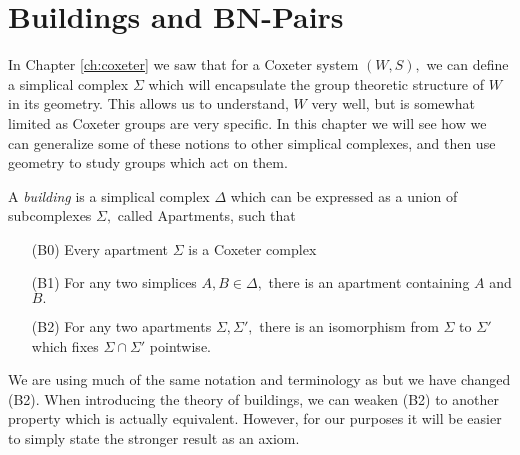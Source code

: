 \documentclass[class=book, crop=false,12 pt]{standalone}
\begin{document}
\chapter{Buildings and BN-Pairs}
\label{ch:building}
In Chapter \ref{ch:coxeter} we saw that for a Coxeter system $(W,S),$ we can define a simplical complex $\Sigma$ which will encapsulate the group theoretic structure of $W$ in its geometry. This allows us to understand, $W$ very well, but is somewhat limited as Coxeter groups are very specific. In this chapter we will see how we can generalize some of these notions to other simplical complexes, and then use geometry to study groups which act on them.

\begin{defn}
	\label{defn:building}
	A \emph{building} is a simplical complex $\Delta$ which can be expressed as a union of subcomplexes $\Sigma,$ called Apartments, such that
	\begin{itemize}
		\item[(B0)] Every apartment $\Sigma$ is a Coxeter complex
		\item[(B1)] For any two simplices $A,B\in \Delta,$ there is an apartment containing $A$ and $B.$
		\item[(B2)] For any two apartments $\Sigma,\Sigma',$ there is an isomorphism from $\Sigma$ to $\Sigma'$ which fixes $\Sigma\cap \Sigma'$ pointwise.
	\end{itemize}
\end{defn}

We are using much of the same notation and terminology as \cite{buildings} but we have changed (B2). When introducing the theory of buildings, we can weaken (B2) to another property which is actually equivalent. However, for our purposes it will be easier to simply state the stronger result as an axiom.
\end{document}
